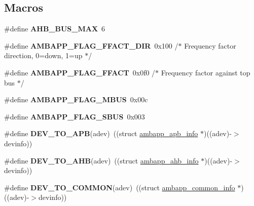 \subsection*{Macros}
\begin{DoxyCompactItemize}
\item 
\mbox{\label{group__amba_ga55debc5d58469c954ae89d1ebb14d07a}} 
\#define {\bfseries A\+H\+B\+\_\+\+B\+U\+S\+\_\+\+M\+AX}~6
\item 
\mbox{\label{group__amba_ga240691a9c5745d6ecd2751afe3dffb12}} 
\#define {\bfseries A\+M\+B\+A\+P\+P\+\_\+\+F\+L\+A\+G\+\_\+\+F\+F\+A\+C\+T\+\_\+\+D\+IR}~0x100	/$\ast$ Frequency factor direction, 0=down, 1=up $\ast$/
\item 
\mbox{\label{group__amba_ga75420d1bf2c37126fff973586abad544}} 
\#define {\bfseries A\+M\+B\+A\+P\+P\+\_\+\+F\+L\+A\+G\+\_\+\+F\+F\+A\+CT}~0x0f0	/$\ast$ Frequency factor against top bus $\ast$/
\item 
\mbox{\label{group__amba_gacbdd3ebb7ab58b7e07235241362643c9}} 
\#define {\bfseries A\+M\+B\+A\+P\+P\+\_\+\+F\+L\+A\+G\+\_\+\+M\+B\+US}~0x00c
\item 
\mbox{\label{group__amba_gacdb71443aef32d87df72fac67fb470a6}} 
\#define {\bfseries A\+M\+B\+A\+P\+P\+\_\+\+F\+L\+A\+G\+\_\+\+S\+B\+US}~0x003
\item 
\mbox{\label{group__amba_gae38907df1969b3a2cb8ff56f8439dac7}} 
\#define {\bfseries D\+E\+V\+\_\+\+T\+O\+\_\+\+A\+PB}(adev)~((struct \mbox{\hyperlink{structambapp__apb__info}{ambapp\+\_\+apb\+\_\+info}} $\ast$)((adev)-\/$>$devinfo))
\item 
\mbox{\label{group__amba_ga5039612c40ed50cc801437a9ea68c456}} 
\#define {\bfseries D\+E\+V\+\_\+\+T\+O\+\_\+\+A\+HB}(adev)~((struct \mbox{\hyperlink{structambapp__ahb__info}{ambapp\+\_\+ahb\+\_\+info}} $\ast$)((adev)-\/$>$devinfo))
\item 
\mbox{\label{group__amba_ga6e3cca161cbb2e25b683abf980bcaeed}} 
\#define {\bfseries D\+E\+V\+\_\+\+T\+O\+\_\+\+C\+O\+M\+M\+ON}(adev)~((struct \mbox{\hyperlink{structambapp__common__info}{ambapp\+\_\+common\+\_\+info}} $\ast$)((adev)-\/$>$devinfo))

\end{DoxyCompactItemize}
